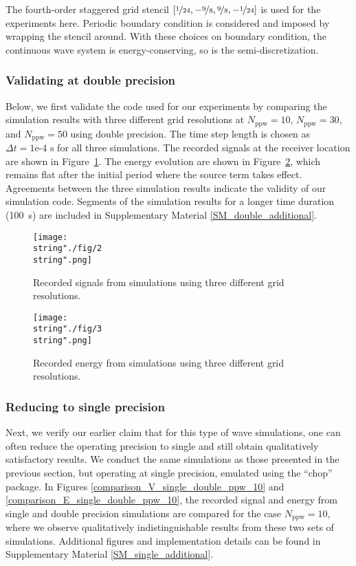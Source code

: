 \documentclass[10pt]{article}
\begin{document}
The fourth-order staggered grid stencil 
$
[\nicefrac{1}{24}, -\nicefrac{9}{8}, \nicefrac{9}{8}, -\nicefrac{1}{24}]
$
is used for the experiments here. 
%
Periodic boundary condition is considered and imposed by wrapping the stencil around.
%
With these choices on boundary condition, the continuous wave system is energy-conserving, so is the semi-discretization.


\subsubsection{Validating at double precision}\label{sec_1D_double}
%
Below, we first validate the code used for our experiments by comparing the simulation results with three different grid resolutions at $N_\text{ppw}=10$, $N_\text{ppw}=30$, and $N_\text{ppw}=50$ using double precision.
%
The time step length is chosen as $\Delta t = \text{1e-4 s}$ for all three simulations.
%
The recorded signals at the receiver location are shown in Figure~\ref{double_Refinement_V}.
%
The energy evolution are shown in Figure~\ref{double_Refinement_E}, which remains flat after the initial period where the source term takes effect.
%
Agreements between the three simulation results indicate the validity of our simulation code.
%
Segments of the simulation results for a longer time duration (100~s) are included in Supplementary Material \ref{SM_double_additional}.


\begin{figure}[H]
\captionsetup{width=1\textwidth, font=footnotesize,labelfont=footnotesize}
\centering
%
\centering\texttt{[image: \\string"./fig/2\\string".png]}
%
\caption{Recorded signals from simulations using three different grid resolutions.}
\label{double_Refinement_V}
\end{figure}


\begin{figure}[H]
\captionsetup{width=1\textwidth, font=footnotesize,labelfont=footnotesize}
\centering
%
\centering\texttt{[image: \\string"./fig/3\\string".png]}
%
\caption{Recorded energy from simulations using three different grid resolutions.}
\label{double_Refinement_E}
\end{figure}


\subsubsection{Reducing to single precision}\label{sec_1D_single}
%
Next, we verify our earlier claim that for this type of wave simulations, one can often reduce the operating precision to single and still obtain qualitatively satisfactory results. 
%
We conduct the same simulations as those presented in the previous section, but operating at single precision, emulated using the ``chop'' package.
%
In Figures \ref{comparison_V_single_double_ppw_10} and \ref{comparison_E_single_double_ppw_10}, the recorded signal and energy from single and double precision simulations are compared for the case $N_\text{ppw} = 10$, where we observe qualitatively indistinguishable results from these two sets of simulations.
%
Additional figures and implementation details can be found in Supplementary Material \ref{SM_single_additional}.
\end{document}
